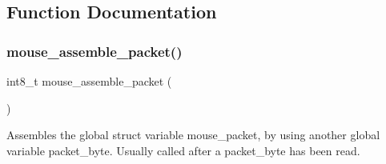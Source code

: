 \subsection{Function Documentation}
\mbox{\label{group__mouse_gac86505acc047efa4adb87f0fa6d4319f}} 
\subsubsection{\texorpdfstring{mouse\+\_\+assemble\+\_\+packet()}{mouse\_assemble\_packet()}}
{\footnotesize\ttfamily int8\+\_\+t mouse\+\_\+assemble\+\_\+packet (\begin{DoxyParamCaption}{ }\end{DoxyParamCaption})}



Assembles the global struct variable mouse\+\_\+packet, by using another global variable packet\+\_\+byte. Usually called after a packet\+\_\+byte has been read. 

